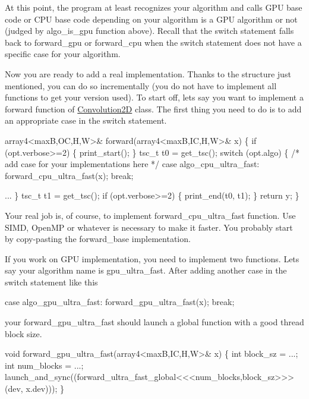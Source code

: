 At this point, the program at least recognizes your algorithm and calls G\+PU base code or C\+PU base code depending on your algorithm is a G\+PU algorithm or not (judged by algo\+\_\+is\+\_\+gpu function above). Recall that the switch statement falls back to forward\+\_\+gpu or forward\+\_\+cpu when the switch statement does not have a specific case for your algorithm.

Now you are ready to add a real implementation. Thanks to the structure just mentioned, you can do so incrementally (you do not have to implement all functions to get your version used). To start off, let\textquotesingle{}s say you want to implement a forward function of \hyperlink{structConvolution2D}{Convolution2D} class. The first thing you need to do is to add an appropriate case in the switch statement.


\begin{DoxyCode}
array4<maxB,OC,H,W>& forward(array4<maxB,IC,H,W>& x) \{
  if (opt.verbose>=2) \{ print\_start(); \}
  tsc\_t t0 = get\_tsc();
  switch (opt.algo) \{
    /* add case for your implementations here */
  case algo\_cpu\_ultra\_fast:
    forward\_cpu\_ultra\_fast(x); break;

    ...
  \}
  tsc\_t t1 = get\_tsc();
  if (opt.verbose>=2) \{ print\_end(t0, t1); \}
  return y;
\}
\end{DoxyCode}


Your real job is, of course, to implement forward\+\_\+cpu\+\_\+ultra\+\_\+fast function. Use S\+I\+MD, Open\+MP or whatever is necessary to make it faster. You probably start by copy-\/pasting the forward\+\_\+base implementation.

If you work on G\+PU implementation, you need to implement two functions. Let\textquotesingle{}s say your algorithm name is gpu\+\_\+ultra\+\_\+fast. After adding another case in the switch statement like this


\begin{DoxyCode}
case algo\_gpu\_ultra\_fast:
  forward\_gpu\_ultra\_fast(x); break;
\end{DoxyCode}


your forward\+\_\+gpu\+\_\+ultra\+\_\+fast should launch a global function with a good thread block size.


\begin{DoxyCode}
void forward\_gpu\_ultra\_fast(array4<maxB,IC,H,W>& x) \{
  int block\_sz = ...;
  int num\_blocks = ...;
  launch\_and\_sync((forward\_ultra\_fast\_global<<<num\_blocks,block\_sz>>>(dev, x.dev)));
\}
\end{DoxyCode}


